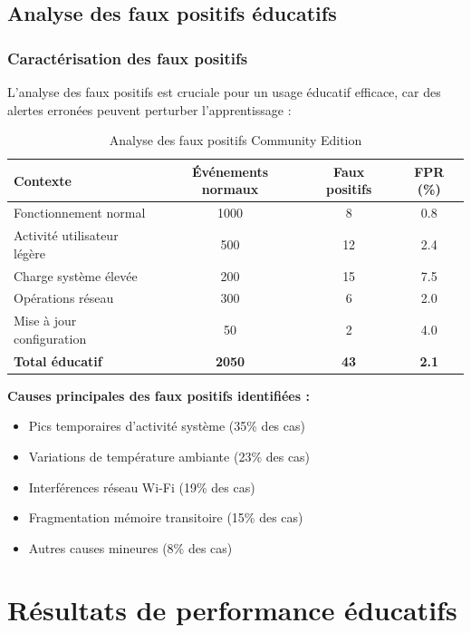\subsection{Analyse des faux positifs éducatifs}

\subsubsection{Caractérisation des faux positifs}

L'analyse des faux positifs est cruciale pour un usage éducatif efficace, car des alertes erronées peuvent perturber l'apprentissage :

\begin{table}[h]
\centering
\caption{Analyse des faux positifs Community Edition}
\label{tab:false-positives-community}
\begin{tabular}{|l|c|c|c|}
\hline
\textbf{Contexte} & \textbf{Événements normaux} & \textbf{Faux positifs} & \textbf{FPR (\%)} \\
\hline
Fonctionnement normal & 1000 & 8 & 0.8 \\
Activité utilisateur légère & 500 & 12 & 2.4 \\
Charge système élevée & 200 & 15 & 7.5 \\
Opérations réseau & 300 & 6 & 2.0 \\
Mise à jour configuration & 50 & 2 & 4.0 \\
\hline
\textbf{Total éducatif} & \textbf{2050} & \textbf{43} & \textbf{2.1} \\
\hline
\end{tabular}
\end{table}

\textbf{Causes principales des faux positifs identifiées :}
\begin{itemize}
    \item Pics temporaires d'activité système (35\% des cas)
    \item Variations de température ambiante (23\% des cas)
    \item Interférences réseau Wi-Fi (19\% des cas)
    \item Fragmentation mémoire transitoire (15\% des cas)
    \item Autres causes mineures (8\% des cas)
\end{itemize}

\section{Résultats de performance éducatifs}


